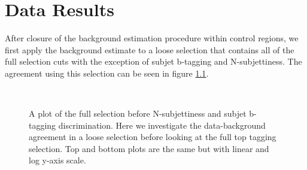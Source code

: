 \chapter{Data Results}
After closure of the background estimation procedure within control regions, 
we first apply the background estimate to a loose selection that contains all of the full selection cuts with the exception of subjet 
b-tagging and N-subjettiness.  The agreement using this selection can be seen in figure \ref{figs:CMSTTonlyMtbvsBkg1}.

\begin{figure}[htcb]
\begin{center}
\\
\caption{
A plot of the full selection before N-subjettiness and subjet b-tagging discrimination.   
Here we investigate the data-background agreement in a loose selection before looking at the full top tagging selection.  Top and bottom plots are the same but with linear and log y-axis scale.}
\label{figs:CMSTTonlyMtbvsBkg1}
\end{center}
\end{figure}

